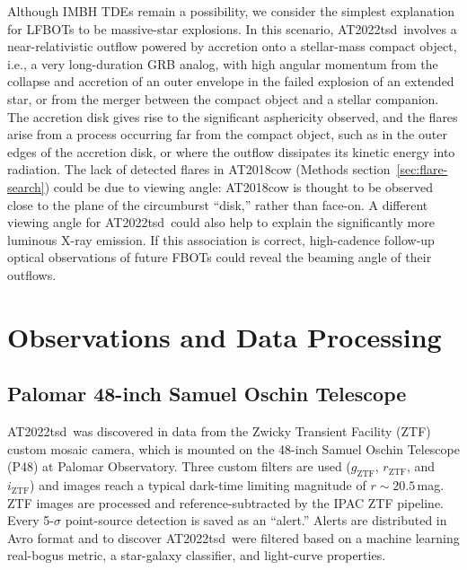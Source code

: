 \documentclass{nature_plusfigure}
\newcommand{\at}{AT2022tsd}
\begin{document}
\begin{methods}
Although IMBH TDEs remain a possibility, we consider the simplest explanation for LFBOTs to be massive-star explosions. In this scenario, \at\ involves a near-relativistic outflow powered by accretion onto a stellar-mass compact object, i.e., a very long-duration GRB analog\cite{Quataert2012}, with high angular momentum from the collapse and accretion of an outer envelope in the failed explosion of an extended star\cite{Perley2021,Metzger2022}, or from the merger between the compact object and a stellar companion\cite{Metzger2022}. The accretion disk gives rise to the significant asphericity observed\cite{Maund2023}, and the flares arise from a process occurring far from the compact object, such as in the outer edges of the accretion disk, or where the outflow dissipates its kinetic energy into radiation. The lack of detected flares in AT2018cow (Methods section~\ref{sec:flare-search}) could be due to viewing angle: AT2018cow is thought to be observed close to the plane of the circumburst ``disk,'' rather than face-on\cite{Margutti2019,Chen2023}. A different viewing angle for \at\ could also help to explain the significantly more luminous X-ray emission.
If this association is correct, high-cadence follow-up optical observations of future FBOTs could reveal the beaming angle of their outflows.

\section{Observations and Data Processing}

\subsection{Palomar 48-inch Samuel Oschin Telescope}
\label{sec:p48}

\at\ was discovered in data from the Zwicky Transient Facility (ZTF) custom mosaic camera\cite{Dekany2020}, which is mounted on the 48-inch Samuel Oschin Telescope (P48) at Palomar Observatory.
Three custom filters are used ($g_{\mathrm{ZTF}}$, $r_{\mathrm{ZTF}}$, and $i_{\mathrm{ZTF}}$\cite{Dekany2020})
and images reach a typical dark-time limiting magnitude of $r\sim20.5\,$mag.
ZTF images are processed and reference-subtracted\cite{Zackay2016}
by the IPAC ZTF pipeline\cite{Masci2019}.
Every 5-$\sigma$ point-source detection is saved as an ``alert.''
Alerts are distributed in Avro format\cite{Patterson2019} and to discover \at\ were filtered based on a machine learning real-bogus metric\cite{Duev2019}, a star-galaxy classifier\cite{Tachibana2018}, and light-curve properties.


\end{methods}
\end{document}
